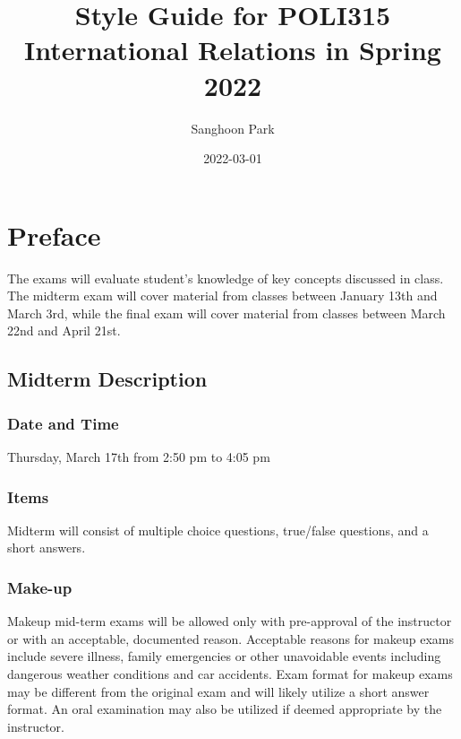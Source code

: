 \documentclass[
]{book}
\title{Style Guide for POLI315 International Relations in Spring 2022}
\author{Sanghoon Park}
\date{2022-03-01}
\begin{document}
\maketitle

{
\setcounter{tocdepth}{1}
\tableofcontents
}
\hypertarget{preface}{%
\chapter*{Preface}\label{preface}}

The exams will evaluate student's knowledge of key concepts discussed in class. The midterm exam will cover material from classes between January 13th and March 3rd, while the final exam will cover material from classes between March 22nd and April 21st.

\hypertarget{midterm-description}{%
\section*{Midterm Description}\label{midterm-description}}

\hypertarget{date-and-time}{%
\subsection*{Date and Time}\label{date-and-time}}

Thursday, March 17th from 2:50 pm to 4:05 pm

\hypertarget{items}{%
\subsection*{Items}\label{items}}

Midterm will consist of multiple choice questions, true/false questions, and a short answers.

\hypertarget{make-up}{%
\subsection*{Make-up}\label{make-up}}

Makeup mid-term exams will be allowed only with pre-approval of the instructor or with an acceptable, documented reason. Acceptable reasons for makeup exams include severe illness, family emergencies or other unavoidable events including dangerous weather conditions and car accidents. Exam format for makeup exams may be different from the original exam and will likely utilize a short answer format. An oral examination may also be utilized if deemed appropriate by the instructor.
\end{document}
